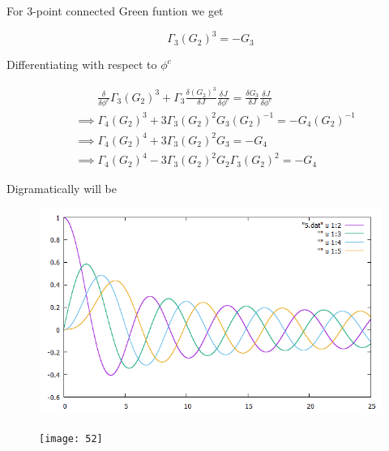 \documentclass[12pt, letterpaper]{article}
\author{Noor E Mustafa Ferdous}
\title{}
\date{}
\newcommand*{\1}{\hspace{1pt}}
\begin{document}
    For 3-point connected Green funtion we get

    \begin{equation}
        \Gamma_{3}(G_{2})^{3} = - G_{3}
    \end{equation}

    Differentiating with respect to $\phi^{c}$

    \begin{align*}
        & \ \ \ \  \ \ \ \ \   \frac{\delta}{\delta \phi^{c}} \Gamma_{3}(G_{2})^{3} + \Gamma_{3}\frac{\delta (G_{2})^{3}}{\delta J}\frac{\delta J}{\delta \phi^{c}}  = \frac{\delta G_{3}}{\delta J}\frac{\delta J}{\delta \phi^{c}} \\ 
        & \implies \Gamma_{4}(G_{2})^{3} + 3 \Gamma_{3}(G_{2})^{2}G_{3}(G_{2})^{-1} = - G_{4}(G_{2})^{-1} \\ 
        & \implies \Gamma_{4} (G_{2})^{4} +3\Gamma_{3}(G_{2})^{2}G_{3}  = - G_{4} \\ 
        & \implies \Gamma_{4} (G_{2})^{4} -3\Gamma_{3}(G_{2})^{2}G_{2}\Gamma_{3}(G_{2})^{2}  = - G_{4} \tag*{[from eqn (1)]}
    \end{align*}

    Digramatically will be 

    \begin{figure}[h]
    \centering
    \includegraphics[scale=0.06]{5}
    \end{figure}

    \begin{figure}[h]
    \centering
    \texttt{[image: 52]}
    \end{figure}

    
\end{document}
